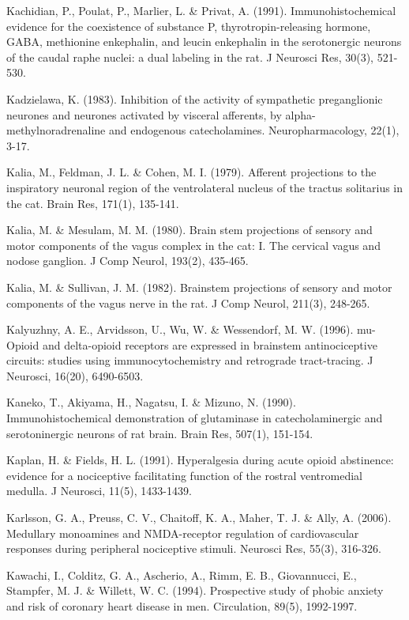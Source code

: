 \documentclass[a4paper,12pt,twoside]{report}
\begin{document}
\begin{singlespacing}
\begin{footnotesize}
Kachidian, P., Poulat, P., Marlier, L. \& Privat, A. (1991). Immunohistochemical evidence for the coexistence of substance P, thyrotropin-releasing hormone, GABA, methionine enkephalin, and leucin enkephalin in the serotonergic neurons of the caudal raphe nuclei: a dual labeling in the rat. J Neurosci Res, 30(3), 521-530.

Kadzielawa, K. (1983). Inhibition of the activity of sympathetic preganglionic neurones and neurones activated by visceral afferents, by alpha-methylnoradrenaline and endogenous catecholamines. Neuropharmacology, 22(1), 3-17.

Kalia, M., Feldman, J. L. \& Cohen, M. I. (1979). Afferent projections to the inspiratory neuronal region of the ventrolateral nucleus of the tractus solitarius in the cat. Brain Res, 171(1), 135-141.

Kalia, M. \& Mesulam, M. M. (1980). Brain stem projections of sensory and motor components of the vagus complex in the cat: I. The cervical vagus and nodose ganglion. J Comp Neurol, 193(2), 435-465.

Kalia, M. \& Sullivan, J. M. (1982). Brainstem projections of sensory and motor components of the vagus nerve in the rat. J Comp Neurol, 211(3), 248-265.

Kalyuzhny, A. E., Arvidsson, U., Wu, W. \& Wessendorf, M. W. (1996). mu-Opioid and delta-opioid receptors are expressed in brainstem antinociceptive circuits: studies using immunocytochemistry and retrograde tract-tracing. J Neurosci, 16(20), 6490-6503.

Kaneko, T., Akiyama, H., Nagatsu, I. \& Mizuno, N. (1990). Immunohistochemical demonstration of glutaminase in catecholaminergic and serotoninergic neurons of rat brain. Brain Res, 507(1), 151-154.

Kaplan, H. \& Fields, H. L. (1991). Hyperalgesia during acute opioid abstinence: evidence for a nociceptive facilitating function of the rostral ventromedial medulla. J Neurosci, 11(5), 1433-1439.

Karlsson, G. A., Preuss, C. V., Chaitoff, K. A., Maher, T. J. \& Ally, A. (2006). Medullary monoamines and NMDA-receptor regulation of cardiovascular responses during peripheral nociceptive stimuli. Neurosci Res, 55(3), 316-326.

Kawachi, I., Colditz, G. A., Ascherio, A., Rimm, E. B., Giovannucci, E., Stampfer, M. J. \& Willett, W. C. (1994). Prospective study of phobic anxiety and risk of coronary heart disease in men. Circulation, 89(5), 1992-1997.


\end{footnotesize}
\end{singlespacing}
\end{document}
